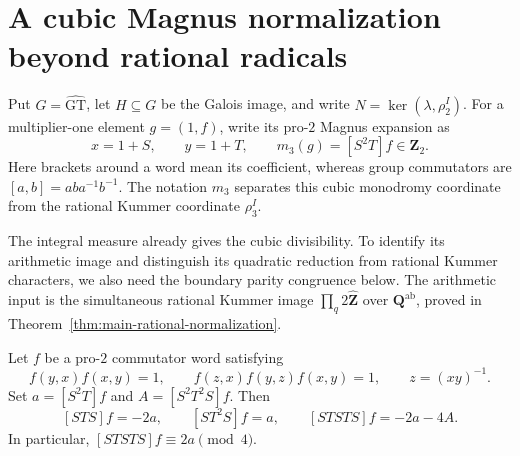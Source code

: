 \section{A cubic Magnus normalization beyond rational radicals}
\label{sec:cubic-magnus-normalization}

Put $G=\widehat{\mathrm{GT}}$, let $H\subseteq G$ be the Galois image, and
write $N=\ker(\lambda,\rho_2^I)$.  For a multiplier-one element
$g=(1,f)$, write its pro-$2$ Magnus expansion as
\[
 x=1+S,\qquad y=1+T,\qquad
 m_3(g)=[S^2T]f\in\mathbf Z_2.
\]
Here brackets around a word mean its coefficient, whereas group commutators
are $[a,b]=aba^{-1}b^{-1}$.  The notation $m_3$ separates this cubic
monodromy coordinate from the rational Kummer coordinate $\rho_3^I$.

The integral measure already gives the cubic divisibility. To identify
its arithmetic image and distinguish its quadratic reduction from rational
Kummer characters, we also need the boundary parity congruence below.
The arithmetic input is the simultaneous rational Kummer image
$\prod_q2\widehat{\mathbf Z}$ over $\mathbf Q^{\mathrm{ab}}$,
proved in Theorem~\ref{thm:main-rational-normalization}.

\begin{lemma}
\label{lem:integral-alternating-cubic}
Let $f$ be a pro-$2$ commutator word satisfying
\[
 f(y,x)f(x,y)=1,\qquad
 f(z,x)f(y,z)f(x,y)=1,\qquad z=(xy)^{-1}.
\]
Set $a=[S^2T]f$ and $A=[S^2T^2S]f$.  Then
\begin{equation}\label{eq:alternating-cubic-identity}
 [STS]f=-2a,\qquad [ST^2S]f=a,\qquad
 [STSTS]f=-2a-4A.
\end{equation}
In particular, $[STSTS]f\equiv2a\pmod4$.
\end{lemma}

